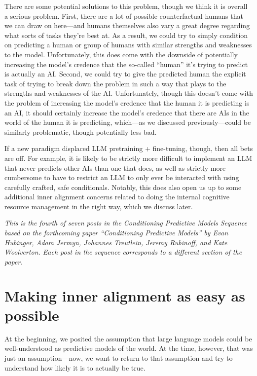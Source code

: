 {There are some potential solutions to this problem, though we think it is overall a serious problem. First, there are a lot of possible counterfactual humans that we can draw on here---and humans themselves also vary a great degree regarding what sorts of tasks they're best at. As a result, we could try to simply condition on predicting a human or group of humans with similar strengths and weaknesses to the model. Unfortunately, this does come with the downside of potentially increasing the model's credence that the so-called ``human'' it's trying to predict is actually an AI. Second, we could try to give the predicted human the explicit task of trying to break down the problem in such a way that plays to the strengths and weaknesses of the AI. Unfortunately, though this doesn't come with the problem of increasing the model's credence that the human it is predicting is an AI, it should certainly increase the model's credence that there are AIs in the world of the human it is predicting, which---as we discussed previously\cite{TODO: cite TODO}---could be similarly problematic, though potentially less bad.

     If a new paradigm displaced LLM pretraining + fine-tuning, though, then all bets are off.
     For example, it is likely to be strictly more difficult to implement an LLM that never predicts other AIs than one that does, as well as strictly more cumbersome to have to restrict an LLM to only ever be interacted with using carefully crafted, safe conditionals.
     Notably, this does also open us up to some additional inner alignment concerns related to doing the internal cognitive resource management in the right way, which we discuss later\cite{TODO: cite TODO}.


\textit{This is the fourth of seven posts in the Conditioning Predictive Models Sequence based on the forthcoming paper ``Conditioning Predictive Models'' by Evan Hubinger, Adam Jermyn, Johannes Treutlein, Jeremy Rubinoff, and Kate Woolverton. Each post in the sequence corresponds to a different section of the paper.}

\section{Making inner alignment as easy as possible}
\label{sec:4}

At the beginning, we posited the assumption that large language models could be well-understood as predictive models of the world. At the time, however, that was just an assumption---now, we want to return to that assumption and try to understand how likely it is to actually be true.

}
